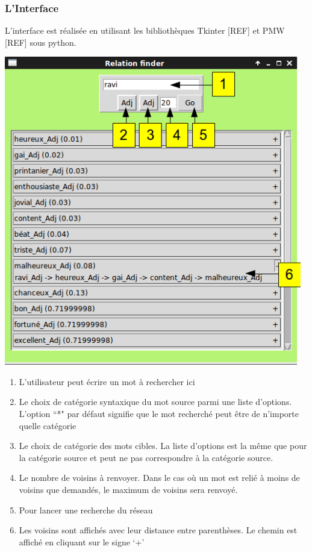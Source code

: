 \subsubsection{L'Interface}

L'interface est réalisée en utilisant les bibliothèques Tkinter [REF] et PMW [REF] sous python.

\begin{center}
\includegraphics[width=13cm]{relationfinderinterface.png}
\end{center}

\begin{enumerate}
    \item{L'utilisateur peut écrire un mot à rechercher ici}
    \item{Le choix de catégorie syntaxique du mot source parmi une liste d'options. L'option ``*" par défaut signifie que le mot recherché peut être de n'importe quelle catégorie}
    \item{Le choix de catégorie des mots cibles. La liste d'options est la même que pour la catégorie source et peut ne pas correspondre à la catégorie source.}
    \item{Le nombre de voisins à renvoyer. Dans le cas où un mot est relié à moins de voisins que demandés, le maximum de voisins sera renvoyé.}
    \item{Pour lancer une recherche du réseau}
    \item{Les voisins sont affichés avec leur distance entre parenthèses. Le chemin est affiché en cliquant sur le signe \lq{+}\rq{}}   

\end{enumerate}


